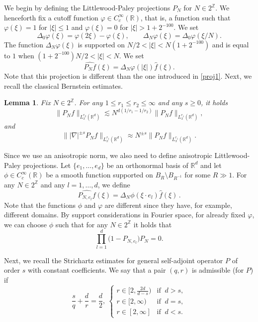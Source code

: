 \documentclass[aihp]{imsart}
\numberwithin{equation}{section}
\theoremstyle{plain}
\newtheorem{lem}[thm]{Lemma}
\theoremstyle{remark}
\newcommand{\R}{\mathbb{R}}
\newcommand{\Z}{\mathbb{Z}}
\begin{document}
We begin by defining the Littlewood-Paley projections $P_N$ for $N\in 2^{\Z}$. We henceforth fix a cutoff function $\varphi \in C_{c}^{\infty} (\R)$, that is, 
a function such that $\varphi (\xi)=1$ for $|\xi|\leq 1$ and $\varphi (\xi)=0$ for $|\xi|>1+2^{-100}$. We set
\begin{equation}\label{dyadic-anulus-bump}
\Delta_{0}\varphi(\xi)=\varphi(2\xi)-\varphi(\xi),\qquad\Delta_{N}\varphi(\xi)=\Delta_{0}\varphi(\xi/N) .
\end{equation}
The function \(\Delta_{N}\varphi(\xi)\) is supported on \(N/2<|\xi|<N(1+2^{-100})\) and is equal to \(1\) when \((1+2^{-100})N/2<|\xi|<N\). We set
\begin{equation}\label{LPproj}
\widehat{P_N f} (\xi)= \Delta_{N}\varphi(|\xi|)\hat{f} (\xi).
\end{equation} 
Note that this projection is different than the one introduced in \eqref{proj1}. Next, we recall the classical Bernstein estimates.

\begin{lem}
\label{bern}
Fix $N\in 2^{\Z}$. For any $1\leq r_1 \leq r_2 \leq \infty$ and any $s\geq 0$, it holds
$$\|P_N f\|_{L_x^{r_2} (\R^d)}\lesssim N^{d(1/r_1 - 1/r_2)} \|P_N f\|_{L_x^{r_1}(\R^d)},$$
and
$$\||\nabla|^{\pm s} P_N f \|_{L_x^{r_1} (\R^d)} \approx N^{\pm s} \|P_N f\|_{L_x^{r_1} (\R^d)}.$$
\end{lem}
Since we use an anisotropic norm, we also need to define anisotropic Littlewood-Paley projections. Let $\{e_1 ,\ldots, e_d\}$ be an orthonormal basis of $\R^d$
and let $\phi \in C^\infty_c(\R)$ be a smooth function supported on \(B_{R}\setminus B_{R^{-1}}\) for some \(R\gg 1\). For any $N\in 2^{\Z}$ and any $l=1,\ldots ,d$, we define
\begin{equation} \label{LP-anisotropic}
\widehat{P_{N,e_l} f} (\xi) = \Delta_{N}\phi(\xi\cdot e_l)\hat{f} (\xi) \,.
\end{equation}
Note that the functions $\phi$ and $\varphi$ are different since they have, for example, different domains.
 By support considerations in Fourier space, for already fixed $\varphi$, we can choose $\phi$ such that for any \( N \in 2^{\Z}\) it holds that
\begin{equation}
\label{e1}
\prod_{l=1}^{d} \Big( 1-  P_{N,e_l}\Big) P_{N} =0.
\end{equation}


Next, we recall the Strichartz estimates for general self-adjoint operator $P$ of order $s$ with constant coefficients. We say that a pair $(q,r)$ is admissible (for $P$) if
\begin{equation}
\label{defadmissible}
\frac{s}{q} +\frac{d}{r}=\frac{d}{2},\ 
\begin{cases}r\in [2, \frac{2d}{d-s}) & \textrm{if } \ d> s, \\  
r\in [2,\infty ) & \textrm{if } \ d=s,\\ 
r\in [2,\infty] &  \textrm{if } \ d <  s. 
\end{cases}
\end{equation}
\end{document}
